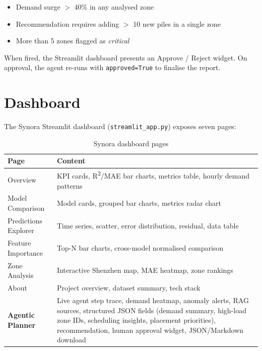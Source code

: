 \documentclass[12pt,a4paper]{article}
\begin{document}
\begin{itemize}
  \item Demand surge $>$ 40\% in any analysed zone
  \item Recommendation requires adding $>$ 10 new piles in a single zone
  \item More than 5 zones flagged as \textit{critical}
\end{itemize}

When fired, the Streamlit dashboard presents an Approve / Reject widget.
On approval, the agent re-runs with \texttt{approved=True} to finalise the report.

\section{Dashboard}

The Synora Streamlit dashboard (\texttt{streamlit\_app.py}) exposes
seven pages:

\begin{table}[H]
\centering
\begin{tabular}{lp{10cm}}
\toprule
\textbf{Page} & \textbf{Content} \\
\midrule
Overview & KPI cards, R\textsuperscript{2}/MAE bar charts, metrics table, hourly demand patterns \\
Model Comparison & Model cards, grouped bar charts, metrics radar chart \\
Predictions Explorer & Time series, scatter, error distribution, residual, data table \\
Feature Importance & Top-N bar charts, cross-model normalised comparison \\
Zone Analysis & Interactive Shenzhen map, MAE heatmap, zone rankings \\
About & Project overview, dataset summary, tech stack \\
\textbf{Agentic Planner} & Live agent step trace, demand heatmap, anomaly alerts,
                          RAG sources, structured JSON fields (demand summary,
                          high-load zone IDs, scheduling insights, placement priorities),
                          recommendation, human approval widget,
                          JSON/Markdown download \\
\bottomrule
\end{tabular}
\caption{Synora dashboard pages}
\end{table}

\end{document}
